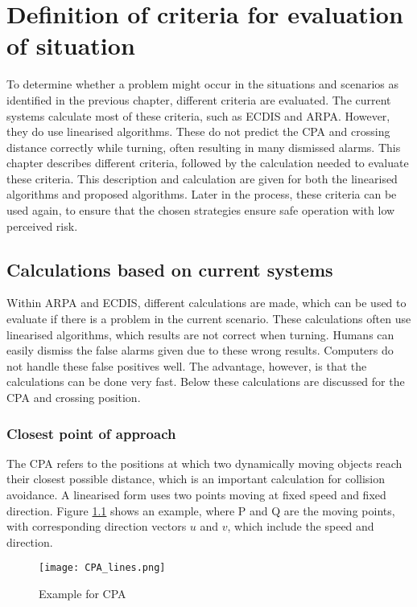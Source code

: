 \chapter{Definition of criteria for evaluation of situation}
\label{ch:criteria-problem}
To determine whether a problem might occur in the situations and scenarios as identified in the previous chapter, different criteria are evaluated. The current systems calculate most of these criteria, such as \ac{ECDIS} and \ac{ARPA}. However, they do use linearised algorithms. These do not predict the \ac{CPA} and crossing distance correctly while turning, often resulting in many dismissed alarms. This chapter describes different criteria, followed by the calculation needed to evaluate these criteria. This description and calculation are given for both the linearised algorithms and proposed algorithms. Later in the process, these criteria can be used again, to ensure that the chosen strategies ensure safe operation with low perceived risk.

\section{Calculations based on current systems}
\label{sec:linearised-methods}
Within \ac{ARPA} and \ac{ECDIS}, different calculations are made, which can be used to evaluate if there is a problem in the current scenario. These calculations often use linearised algorithms, which results are not correct when turning. Humans can easily dismiss the false alarms given due to these wrong results. Computers do not handle these false positives well. The advantage, however, is that the calculations can be done very fast. Below these calculations are discussed for the \acf{CPA} and crossing position.

\subsection{Closest point of approach}
The \ac{CPA} refers to the positions at which two dynamically moving objects reach their closest possible distance, which is an important calculation for collision avoidance. A linearised form uses two points moving at fixed speed and fixed direction. Figure \ref{fig:CPA} shows an example, where P and Q are the moving points, with corresponding direction vectors $u$ and $v$, which include the speed and direction.

\begin{figure}[h]
	\centering
	\texttt{[image: CPA\_lines.png]}
	\caption{Example for \acf{CPA}}
	\label{fig:CPA}
\end{figure}

